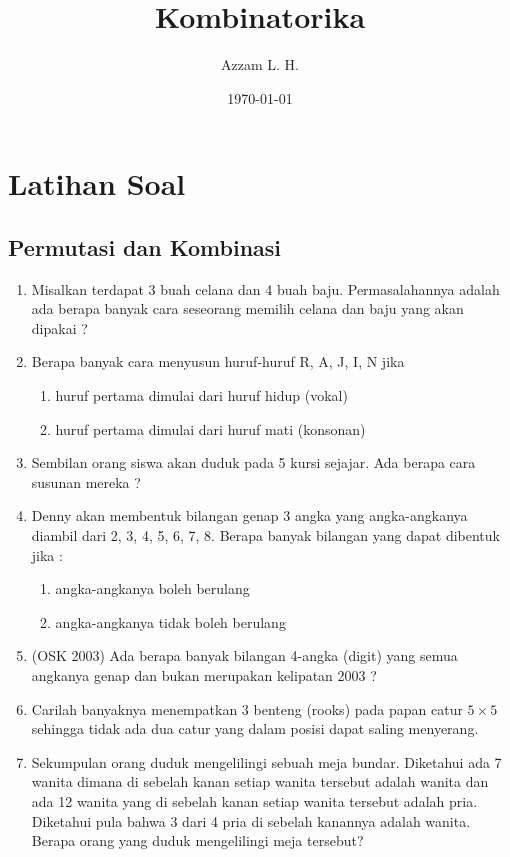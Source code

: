 \documentclass[11pt]{scrartcl}
\begin{document}
	\title{Kombinatorika} %
	\date{\today}
	\author{Azzam L. H.}
	\maketitle
\section{Latihan Soal}

\subsection{Permutasi dan Kombinasi}
\begin{enumerate}
    \item Misalkan terdapat 3 buah celana dan 4 buah baju. Permasalahannya adalah ada berapa banyak cara 
seseorang memilih celana dan baju yang akan dipakai ?

    \item Berapa banyak cara menyusun huruf-huruf R, A, J, I, N jika 
\begin{enumerate}
    \item huruf pertama dimulai dari huruf hidup (vokal) 
    \item huruf pertama dimulai dari huruf mati (konsonan) 
\end{enumerate}

    \item Sembilan orang siswa akan duduk pada 5 kursi sejajar. Ada berapa cara susunan mereka ? 
    
    \item Denny akan membentuk bilangan genap 3 angka yang angka-angkanya diambil dari 2, 3, 4, 5, 6, 7, 8. 
Berapa banyak bilangan yang dapat dibentuk jika : 
    \begin{enumerate}
        \item angka-angkanya boleh berulang 
\item angka-angkanya tidak boleh berulang
    \end{enumerate}
    
    \item (OSK 2003) Ada berapa banyak bilangan 4-angka (digit) yang semua angkanya genap dan bukan 
merupakan kelipatan 2003 ?
    \item  Carilah banyaknya menempatkan 3 benteng (rooks) pada papan catur $5 \times 5$ sehingga
tidak ada dua catur yang dalam posisi dapat saling menyerang.

    \item Sekumpulan orang duduk mengelilingi sebuah meja bundar. Diketahui ada 7 wanita
dimana di sebelah kanan setiap wanita tersebut adalah wanita dan ada 12 wanita yang di
sebelah kanan setiap wanita tersebut adalah pria. Diketahui pula bahwa 3 dari 4 pria di
sebelah kanannya adalah wanita. Berapa orang yang duduk mengelilingi meja tersebut?


\end{enumerate}
\end{document}
